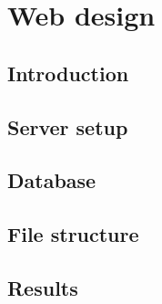 \chapter{Web design}
\section{Introduction}
%

\section{Server setup}
%

\section{Database}
%

\section{File structure}
%

\section{Results}
%









